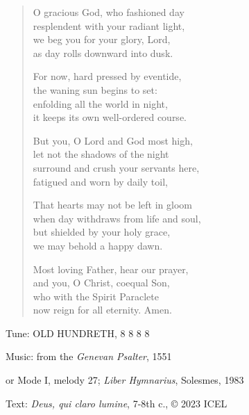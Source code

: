 \hymn

\begin{verse}
O gracious God, who fashioned day\\
resplendent with your radiant light,\\
we beg you for your glory, Lord,\\
as day rolls downward into dusk.

For now, hard pressed by eventide,\\
the waning sun begins to set:\\
enfolding all the world in night,\\
it keeps its own well-ordered course.

But you, O Lord and God most high,\\
let not the shadows of the night\\
surround and crush your servants here,\\
fatigued and worn by daily toil,

That hearts may not be left in gloom\\
when day withdraws from life and soul,\\
but shielded by your holy grace,\\
we may behold a happy dawn.

Most loving Father, hear our prayer,\\
and you, O Christ, coequal Son,\\
who with the Spirit Paraclete\\
now reign for all eternity. Amen.
\end{verse}

\begin{hymnsource}
Tune: OLD HUNDRETH, 8 8 8 8

Music: from the \emph{Genevan Psalter}, 1551

or Mode I, melody 27; \emph{Liber Hymnarius}, Solesmes, 1983

Text: \emph{Deus, qui claro lumine}, 7-8th c., © 2023 ICEL
\end{hymnsource}